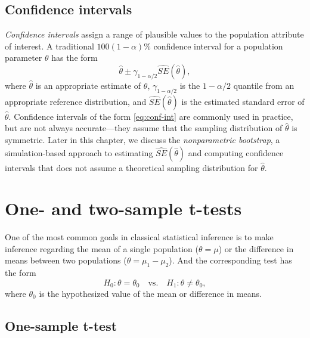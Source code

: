 \documentclass[]{book}
\theoremstyle{definition}
\theoremstyle{definition}
\theoremstyle{definition}
\theoremstyle{remark}
\begin{document}
\hypertarget{confidence-intervals}{%
\subsection{Confidence intervals}\label{confidence-intervals}}

\emph{Confidence intervals} assign a range of plausible values to the
population attribute of interest. A traditional
\(100\left(1 - \alpha\right)\)\% confidence interval for a population
parameter \(\theta\) has the form \begin{equation}
  \widehat{\theta} \pm \gamma_{1 - \alpha / 2} \widehat{SE}\left(\widehat{\theta}\right),
  \label{eq:conf-int}
\end{equation} where \(\widehat{\theta}\) is an appropriate estimate of
\(\theta\), \(\gamma_{1 - \alpha / 2}\) is the \(1 - \alpha / 2\)
quantile from an appropriate reference distribution, and
\(\widehat{SE}\left(\widehat{\theta}\right)\) is the estimated standard
error of \(\widehat{\theta}\). Confidence intervals of the form
\eqref{eq:conf-int} are commonly used in practice, but are not always
accurate---they assume that the sampling distribution of
\(\widehat{\theta}\) is symmetric. Later in this chapter, we discuss the
\emph{nonparametric bootstrap}, a simulation-based approach to
estimating \(\widehat{SE}\left(\widehat{\theta}\right)\) and computing
confidence intervals that does not assume a theoretical sampling
distribution for \(\widehat{\theta}\).

\hypertarget{one--and-two-sample-t-tests}{%
\section{One- and two-sample
t-tests}\label{one--and-two-sample-t-tests}}

One of the most common goals in classical statistical inference is to
make inference regarding the mean of a single population
(\(\theta = \mu\)) or the difference in means between two populations
(\(\theta = \mu_1 - \mu_2\)). And the corresponding test has the form \[
  H_0: \theta = \theta_0 \quad \text{vs.} \quad H_1: \theta \ne \theta_0,
\] where \(\theta_0\) is the hypothesized value of the mean or
difference in means.

\hypertarget{one-sample-t-test}{%
\subsection{One-sample t-test}\label{one-sample-t-test}}
\end{document}
